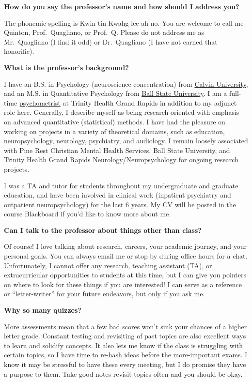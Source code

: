 \documentclass[
  12pt,
  letterpaper,
]{scrartcl}
\begin{document}
\textbf{How do you say the professor's name and how should I address
you?}

The phonemic spelling is Kwin-tin Kwahg-lee-ah-no. You are welcome to
call me Quinton, Prof.~Quagliano, or Prof.~Q. Please do not address me
as Mr.~Quagliano (I find it odd) or Dr.~Quagliano (I have not earned
that honorific).

\textbf{What is the professor's background?}

I have an B.S. in Psychology (neuroscience concentration) from
\href{https://calvin.edu/}{Calvin University}, and an M.S. in
Quantitative Psychology from \href{https://www.bsu.edu/}{Ball State
University}. I am a full-time
\href{https://www.napnet.org/what}{psychometrist} at Trinity Health
Grand Rapids in addition to my adjunct role here. Generally, I describe
myself as being research-oriented with emphasis on advanced quantitative
(statistical) methods. I have had the pleasure on working on projects in
a variety of theoretical domains, such as education, neuropsychology,
neurology, psychiatry, and audiology. I remain loosely associated with
Pine Rest Christian Mental Health Services, Ball State University, and
Trinity Health Grand Rapids Neurology/Neuropsychology for ongoing
research projects.

I was a TA and tutor for students throughout my undergraduate and
graduate education, and have been involved in clinical work (inpatient
psychiatry and outpatient neuropsychology) for the last 6 years. My CV
will be posted in the course Blackboard if you'd like to know more about
me.

\textbf{Can I talk to the professor about things other than class?}

Of course! I love talking about research, careers, your academic
journey, and your personal goals. You can always email me or stop by
during office hours for a chat. Unfortunately, I cannot offer any
research, teaching assistant (TA), or extracurricular opportunities to
students at this time, but I can give you pointers on where to look for
these things if you are interested! I can serve as a reference or
``letter-writer'' for your future endeavors, but only if you ask me.

\textbf{Why so many quizzes?}

More assessments mean that a few bad scores won't sink your chances of a
higher letter grade. Constant testing and revisiting of past topics are
also excellent ways to learn and solidify concepts. It also lets me know
if the class is struggling with certain topics, so I have time to
re-hash ideas before the more-important exams. I know it may be
stressful to have these every meeting, but I do promise they have a
purpose to them. Take good notes revisit topics often and you should be
okay.
\end{document}
